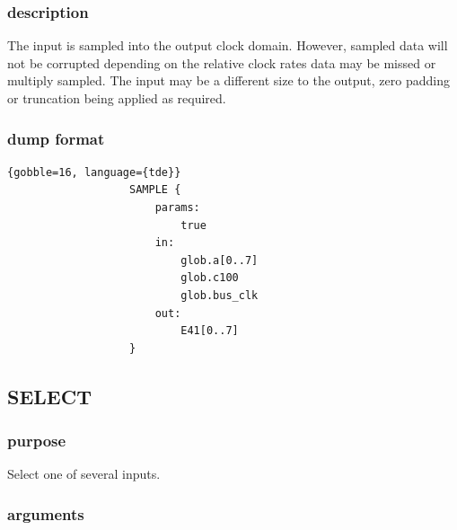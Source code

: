             \subsubsection{description}

                The input is sampled into the output clock domain. However, sampled
                data will not be corrupted depending on the relative
                clock rates data may be missed or multiply sampled. The input
                may be a different size to the output, zero padding or
                truncation being applied as required.

            \subsubsection{dump format}
            
                \begin{lstlisting}{gobble=16, language={tde}}
                   SAMPLE {
                       params:
                           true
                       in:
                           glob.a[0..7]
                           glob.c100
                           glob.bus_clk
                       out:
                           E41[0..7]
                   }
                \end{lstlisting}


        \subsection{SELECT}

            \subsubsection{purpose}
            
                Select one of several inputs.

            \subsubsection{arguments}
            
